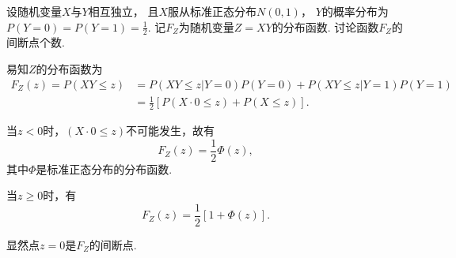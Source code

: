 \begin{example}
设随机变量\(X\)与\(Y\)相互独立，
且\(X\)服从标准正态分布\(N(0,1)\)，
\(Y\)的概率分布为\(P(Y=0) = P(Y=1) = \frac12\).
记\(F_Z\)为随机变量\(Z=XY\)的分布函数.
讨论函数\(F_Z\)的间断点个数.
\begin{solution}
易知\(Z\)的分布函数为\begin{align*}
	F_Z(z) = P(XY \leq z)
	&= P(XY \leq z \vert Y = 0) P(Y = 0)
	+ P(XY \leq z \vert Y = 1) P(Y = 1) \\
	&= \frac12 \left[ P(X\cdot0 \leq z) + P(X \leq z) \right].
\end{align*}

当\(z < 0\)时，\((X\cdot0 \leq z)\)不可能发生，故有\begin{equation*}
	F_Z(z) = \frac12 \Phi(z),
\end{equation*}
其中\(\Phi\)是标准正态分布的分布函数.

当\(z \geq 0\)时，有\begin{equation*}
	F_Z(z) = \frac12 [1 + \Phi(z)].
\end{equation*}

显然点\(z=0\)是\(F_Z\)的间断点.
\end{solution}
\end{example}

